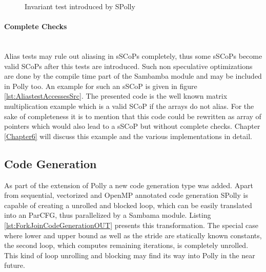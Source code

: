 \lstset{frame=none}
\begin{figure}[htbp]
  \centering
  \hspace*{5mm}
  \caption{Invariant test introduced by SPolly}
  \label{lst:InvariantTest}  
\end{figure}
\resetlst

\paragraph{Complete Checks \\}
~\\
Alias tests may rule out aliasing in sSCoPs completely, thus some sSCoPs become
valid SCoPs after this tests are introduced. Such non speculative optimizations
are done by the compile time part of the Sambamba module and may be included in 
Polly too. An example for such an sSCoP is given in figure 
\ref{lst:AliastestAccessesSrc}. The presented code is the well known
matrix multiplication example which is a valid SCoP if the arrays do not alias.
For the sake of completeness it is to mention that this code could be
rewritten as array of pointers which would also lead to a sSCoP but without
complete checks. Chapter \ref{Chapter6} will discuss this example and the various
implementations in detail.


\subsection{Code Generation}
As part of the extension of Polly a new code generation type was added. Apart 
from sequential, vectorized and OpenMP annotated code generation SPolly is 
capable of creating a unrolled and blocked loop, which can be easily 
translated into an ParCFG, thus parallelized by a Sambama module. Listing 
\ref{lst:ForkJoinCodeGenerationOUT} presents this transformation. The special 
case where lower and upper bound as well as the 
stride are statically known constants, the second loop, which computes 
remaining iterations, is completely unrolled.
This kind of loop unrolling and blocking may find its 
way into Polly in the near future. 

